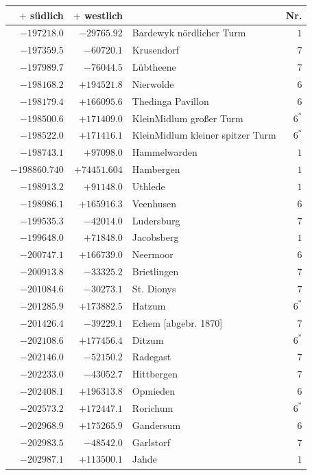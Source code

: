 \clearpage{}%
\begin{center}\begingroup\fontsize{8}{9}\selectfont
\setlength{\tabcolsep}{4pt}
\begin{tabular}{r|r|p{170pt}|r}\hline
\(+\) südlich&\(+\) westlich&&Nr.\\\hline
\(-197218.0\)&\(-29765.92\)&Bardewyk nördlicher Turm&\(1\)\\
\(-197359.5\)&\(-60720.1\)&Krusendorf&\(7\)\\
\(-197989.7\)&\(-76044.5\)&Lübtheene&\(7\)\\
\(-198168.2\)&\(+194521.8\)&Nierwolde&\(6\)\\
\(-198179.4\)&\(+166095.6\)&Thedinga Pavillon&\(6\)\\
\(-198500.6\)&\(+171409.0\)&KleinMidlum großer Turm&\(6^{*}\)\\
\(-198522.0\)&\(+171416.1\)&KleinMidlum kleiner spitzer Turm&\(6^{*}\)\\
\(-198743.1\)&\(+97098.0\)&Hammelwarden&\(1\)\\
\(-198860.740\)&\(+74451.604\)&Hambergen&\(1\)\\
\(-198913.2\)&\(+91148.0\)&Uthlede&\(1\)\\
\(-198986.1\)&\(+165916.3\)&Veenhusen&\(6\)\\
\(-199535.3\)&\(-42014.0\)&Ludersburg&\(7\)\\
\(-199648.0\)&\(+71848.0\)&Jacobsberg&\(1\)\\
\(-200747.1\)&\(+166739.0\)&Neermoor&\(6\)\\
\(-200913.8\)&\(-33325.2\)&Brietlingen&\(7\)\\
\(-201084.6\)&\(-30273.1\)&St. Dionys&\(7\)\\
\(-201285.9\)&\(+173882.5\)&Hatzum&\(6^{*}\)\\
\(-201426.4\)&\(-39229.1\)&Echem [abgebr. 1870]&\(7\)\\
\(-202108.6\)&\(+177456.4\)&Ditzum&\(6^{*}\)\\
\(-202146.0\)&\(-52150.2\)&Radegast&\(7\)\\
\(-202233.0\)&\(-43052.7\)&Hittbergen&\(7\)\\
\(-202408.1\)&\(+196313.8\)&Opmieden&\(6\)\\
\(-202573.2\)&\(+172447.1\)&Rorichum&\(6^{*}\)\\
\(-202968.9\)&\(+175265.9\)&Gandersum&\(6\)\\
\(-202983.5\)&\(-48542.0\)&Garlstorf&\(7\)\\
\(-202987.1\)&\(+113500.1\)&Jahde&\(1\)\\

\end{tabular}
\end{center}
